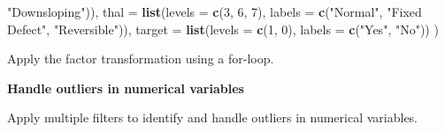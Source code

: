 \documentclass[
]{article}
\newenvironment{Shaded}{\begin{snugshade}}{\end{snugshade}}
\newcommand{\AttributeTok}[1]{\textcolor[rgb]{0.13,0.29,0.53}{#1}}
\newcommand{\ControlFlowTok}[1]{\textcolor[rgb]{0.13,0.29,0.53}{\textbf{#1}}}
\newcommand{\DecValTok}[1]{\textcolor[rgb]{0.00,0.00,0.81}{#1}}
\newcommand{\FloatTok}[1]{\textcolor[rgb]{0.00,0.00,0.81}{#1}}
\newcommand{\FunctionTok}[1]{\textcolor[rgb]{0.13,0.29,0.53}{\textbf{#1}}}
\newcommand{\NormalTok}[1]{#1}
\newcommand{\OtherTok}[1]{\textcolor[rgb]{0.56,0.35,0.01}{#1}}
\newcommand{\SpecialCharTok}[1]{\textcolor[rgb]{0.81,0.36,0.00}{\textbf{#1}}}
\newcommand{\StringTok}[1]{\textcolor[rgb]{0.31,0.60,0.02}{#1}}
\begin{document}
\begin{Shaded}
\begin{Highlighting}[]
                                               \StringTok{"Downsloping"}\NormalTok{)),}
  \AttributeTok{thal =} \FunctionTok{list}\NormalTok{(}\AttributeTok{levels =} \FunctionTok{c}\NormalTok{(}\DecValTok{3}\NormalTok{, }\DecValTok{6}\NormalTok{, }\DecValTok{7}\NormalTok{), }\AttributeTok{labels =} \FunctionTok{c}\NormalTok{(}\StringTok{"Normal"}\NormalTok{, }\StringTok{"Fixed Defect"}\NormalTok{, }\StringTok{"Reversible"}\NormalTok{)),}
  \AttributeTok{target =} \FunctionTok{list}\NormalTok{(}\AttributeTok{levels =} \FunctionTok{c}\NormalTok{(}\DecValTok{1}\NormalTok{, }\DecValTok{0}\NormalTok{), }\AttributeTok{labels =} \FunctionTok{c}\NormalTok{(}\StringTok{"Yes"}\NormalTok{, }\StringTok{"No"}\NormalTok{))}
\NormalTok{)}
\end{Highlighting}
\end{Shaded}

Apply the factor transformation using a for-loop.

\begin{Shaded}
\end{Shaded}

\textbf{Handle outliers in numerical variables}

Apply multiple filters to identify and handle outliers in numerical
variables.

\begin{Shaded}
\end{Shaded}
\end{document}
